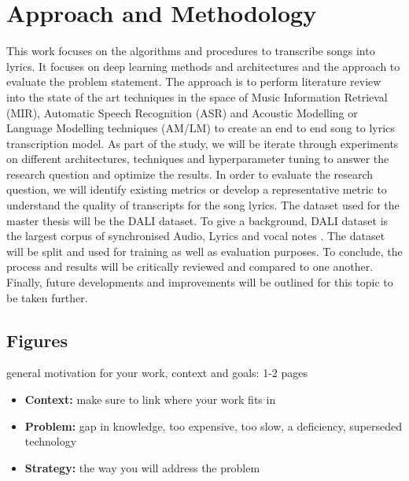 \section{Approach and Methodology}

This work focuses on the algorithms and procedures to transcribe songs into lyrics. It focuses on deep learning methods and architectures and the approach to evaluate the problem statement. The approach is to perform literature review into the state of the art techniques in the space of Music Information Retrieval (MIR), Automatic Speech Recognition (ASR) and Acoustic Modelling or Language Modelling techniques (AM/LM) to create an end to end song to lyrics transcription model. As part of the study, we will be iterate through experiments on different architectures, techniques and hyperparameter tuning to answer the research question and optimize the results. In order to evaluate the research question, we will identify existing metrics or develop a representative metric to understand the quality of transcripts for the song lyrics. The dataset used for the master thesis will be the DALI dataset. To give a background, DALI dataset is the largest corpus of  synchronised Audio, Lyrics and vocal notes \cite{meseguer2020creating}. The dataset will be split and used for training as well as evaluation purposes. To conclude, the process and results will be critically reviewed and compared to one another. Finally, future developments and improvements will be outlined for this topic to be taken further. 

\subsection{Figures}%
\label{sec:figures}

general motivation for your work, context and goals: 1-2 pages

\begin{itemize}
    \item \textbf{Context:} make sure to link where your work fits in
    \item \textbf{Problem:} gap in knowledge, too expensive, too slow, a deficiency, superseded technology
    \item \textbf{Strategy:} the way you will address the problem
\end{itemize}
